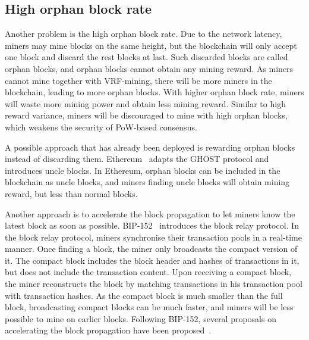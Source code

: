 \subsection{High orphan block rate}

Another problem is the high orphan block rate.
Due to the network latency, miners may mine blocks on the same height, but the blockchain will only accept one block and discard the rest blocks at last.
Such discarded blocks are called orphan blocks, and orphan blocks cannot obtain any mining reward.
As miners cannot mine together with VRF-mining, there will be more miners in the blockchain, leading to more orphan blocks.
With higher orphan block rate, miners will waste more mining power and obtain less mining reward.
Similar to high reward variance, miners will be discouraged to mine with high orphan blocks, which weakens the security of PoW-based consensus.

A possible approach that has already been deployed is rewarding orphan blocks instead of discarding them.
Ethereum~\cite{wood2014ethereum} adapts the GHOST protocol and introduces uncle blocks.
In Ethereum, orphan blocks can be included in the blockchain as uncle blocks, and miners finding uncle blocks will obtain mining reward, but less than normal blocks.

Another approach is to accelerate the block propagation to let miners know the latest block as soon as possible.
BIP-152~\cite{corallo2016bip} introduces the block relay protocol.
In the block relay protocol, miners synchronise their transaction pools in a real-time manner.
Once finding a block, the miner only broadcasts the compact version of it.
The compact block includes the block header and hashes of transactions in it, but does not include the transaction content.
Upon receiving a compact block, the miner reconstructs the block by matching transactions in his transaction pool with transaction hashes.
As the compact block is much smaller than the full block, broadcasting compact blocks can be much faster, and miners will be less possible to mine on earlier blocks.
Following BIP-152, several proposals on accelerating the block propagation have been proposed~\cite{ozisik2019graphene}\cite{klarman2018bloxroute}\cite{naumenko2019bandwidth}.





